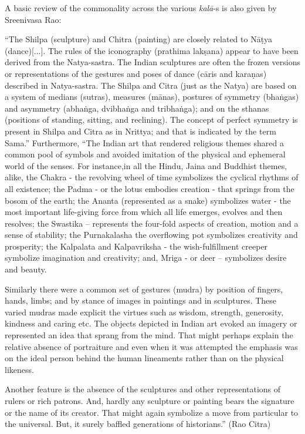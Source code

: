 A basic review of the commonality across the various \textsl{kalā}-s is also given by Sreenivasa Rao:

\begin{myquote}
“The Shilpa (sculpture) and Chitra (painting) are closely related to Nāṭya (dance)[...]. The rules of the iconography (prathima lakṣana) appear to have been derived from the Natya-sastra. The Indian sculptures are often the frozen versions or representations of the gestures and poses of dance (cāris and karaṇas) described in Natya-sastra. The Shilpa and Citra (just as the Natya) are based on a system of medians (sutras), measures (mānas), postures of symmetry (bhaṅgas) and asymmetry (abhaṅga, dvibhaṅga and tribhaṅga); and on the sthanas (positions of standing, sitting, and reclining). The concept of perfect symmetry is present in Shilpa and Citra as in Nrittya; and that is indicated by the term Sama.” Furthermore, “The Indian art that rendered religious themes shared a common pool of symbols and avoided imitation of the physical and ephemeral world of the senses. For instance,in all the Hindu, Jaina and Buddhist themes, alike, the Chakra - the revolving wheel of time symbolizes the cyclical rhythms of all existence; the Padma - or the lotus embodies creation - that springs from the bosom of the earth; the Ananta (represented as a snake) symbolizes water - the most important life-giving force from which all life emerges, evolves and then resolves; the Swastika – represents the four-fold aspects of creation, motion and a sense of stability; the Purnakalasha the overflowing pot symbolizes creativity and prosperity; the Kalpalata and Kalpavriksha - the wish-fulfillment creeper symbolize imagination and creativity; and, Mriga - or deer – symbolizes desire and beauty.

Similarly there were a common set of gestures (mudra) by position of fingers, hands, limbs; and by stance of images in paintings and in sculptures. These varied mudras made explicit the virtues such as wisdom, strength, generosity, kindness and caring etc. The objects depicted in Indian art evoked an imagery or represented an idea that sprang from the mind. That might perhaps explain the relative absence of portraiture and even when it was attempted the emphasis was on the ideal person behind the human lineaments rather than on the physical likeness.

Another feature is the absence of the sculptures and other representations of rulers or rich patrons. And, hardly any sculpture or painting bears the signature or the name of its creator. That might again symbolize a move from particular to the universal. But, it surely baffled generations of historians.” (Rao Citra)
\end{myquote}

